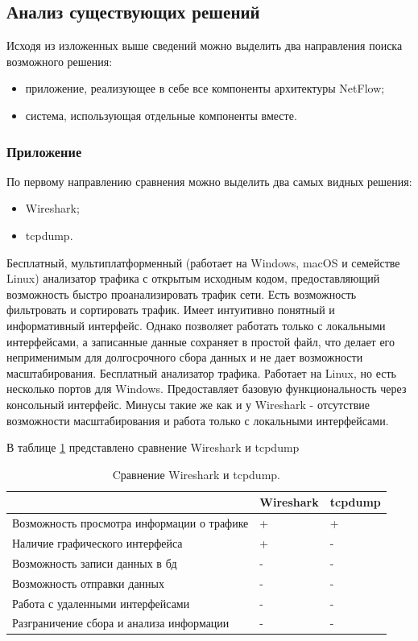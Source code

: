 \subsection{ Анализ существующих решений}
Исходя из изложенных выше сведений можно выделить два направления поиска возможного решения:
\begin{itemize}
	\item приложение, реализующее в себе все компоненты архитектуры NetFlow;
	\item система, использующая отдельные компоненты вместе.
\end{itemize}

\subsubsection{ Приложение }
По первому направлению сравнения можно выделить два самых видных решения:
\begin{itemize}
	\item Wireshark;
	\item tcpdump.
\end{itemize}

Бесплатный, мультиплатформенный (работает на Windows, macOS и семействе Linux) анализатор трафика с открытым исходным кодом, предоставляющий возможность быстро проанализировать трафик сети\cite{wireshark}. Есть возможность фильтровать и сортировать трафик. Имеет интуитивно понятный и информативный интерфейс. Однако позволяет работать только с локальными интерфейсами, а записанные данные сохраняет в простой файл, что делает его неприменимым для долгосрочного сбора данных и не дает возможности масштабирования.
Бесплатный анализатор трафика\cite{tcpdump}. Работает на Linux, но есть несколько портов для Windows. Предоставляет базовую функциональность через консольный интерфейс. Минусы такие же как и у Wireshark - отсутствие возможности масштабирования и работа только с локальными интерфейсами.

В таблице \ref{CompareWP} представлено сравнение Wireshark и tcpdump
\begin{table}[H]
\caption{Cравнение Wireshark и tcpdump.}
\begin{center}
\begin{tabular}{ |p{5cm} |p{5cm}| p{5cm} |}
\hline
 & Wireshark & tcpdump  \\ \hline 
Возможность просмотра информации о трафике & + & + \\ \hline 
Наличие графического интерфейса & + & -  \\ \hline 
Возможность записи данных в бд & - & - \\ \hline 
Возможность отправки данных & - & - \\ \hline 
Работа с удаленными интерфейсами & - & - \\ \hline 
Разграничение сбора и анализа информации & - & - \\ \hline
\end{tabular}
\end{center}
\label{CompareWP}
\end{table}

